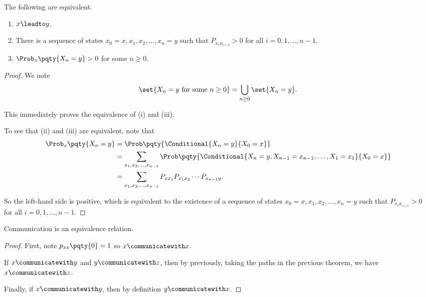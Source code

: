 \begin{theorem}
    The following are equivalent.
    
    \begin{enumerate}[label=(\roman*)]
        \item \(x \leadto y\).
        \item There is a sequence of states \(x_0 = x, x_1, x_2, \ldots, x_n = y\) such that \(P_{x_i x_{i + 1}} > 0\) for all \(i = 0, 1, \ldots, n - 1\).
        \item \(\Prob_x \pqty{X_n = y} > 0\) for some \(n \geq 0\).
    \end{enumerate}
\end{theorem}

\begin{proof}
    We note
    \[
        \set{X_n = y \text{ for some } n \geq 0} = \bigcup_{n \geq 0} \set{X_n = y}.
    \]

    This immediately proves the equivalence of (i) and (iii).

    To see that (ii) and (iii) are equivalent, note that
    \begin{align*}
        \Prob_x \pqty{X_n = y} &= \Prob\pqty{\Conditional{X_n = y}{X_0 = x}} \\
        &= \sum_{x_1, x_2, \ldots, x_{n - 1}} \Prob\pqty{\Conditional{X_n = y, X_{n - 1} = x_{n - 1}, \ldots, X_1 = x_1}{X_0 = x}} \\
        &= \sum_{x_1, x_2, \ldots, x_{n - 1}} P_{x x_1} P_{x_1 x_2} \cdots P_{x_{n - 1} y}.
    \end{align*}

    So the left-hand side is positive, which is equivalent to the existence of a sequence of states \(x_0 = x, x_1, x_2, \ldots, x_n = y\) such that \(P_{x_i x_{i + 1}} > 0\) for all \(i = 0, 1, \ldots, n - 1\).
\end{proof}

\begin{corollary}
    Communication is an equivalence relation.
\end{corollary}

\begin{proof}
    First, note \(p_{xx} \pqty{0} = 1\) so \(x \communicatewith x\).

    If \(x \communicatewith y\) and \(y \communicatewith z\), then by previously, taking the paths in the previous theorem, we have \(x \communicatewith z\).

    Finally, if \(x \communicatewith y\), then by definition \(y \communicatewith x\).
\end{proof}

